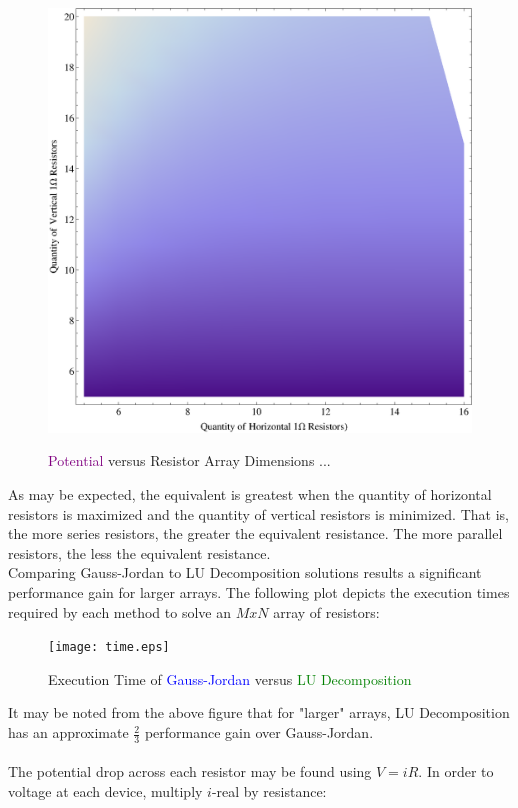 \documentclass{report}
\begin{document}
\begin{enumerate}
\begin{figure}[H]
\centering \caption{\textcolor{purple}{Potential} versus Resistor Array Dimensions ...}
\includegraphics[scale=.72]{equivalent.eps}
\label{equiv}
\end{figure}
As may be expected, the equivalent is greatest when the quantity of horizontal resistors is maximized and the quantity of vertical resistors is minimized. That is, the more series resistors, the greater the equivalent resistance. The more parallel resistors, the less the equivalent resistance.
\\
Comparing Gauss-Jordan to LU Decomposition solutions results a significant performance gain for larger arrays. The following plot depicts the execution times required by each method to solve an $MxN$ array of resistors:
\begin{figure}[H]
\centering \caption{Execution Time of \textcolor{blue}{Gauss-Jordan} versus \textcolor{green}{LU Decomposition}}
\texttt{[image: time.eps]}
\label{time}
\end{figure}
It may be noted from the above figure that for "larger" arrays, LU Decomposition has an approximate $\frac{2}{3}$ performance gain over Gauss-Jordan.
\\
\\The potential drop across each resistor may be found using $V=iR$. In order to voltage at each device, multiply $i$-real by resistance: 

\end{enumerate}
\end{document}
